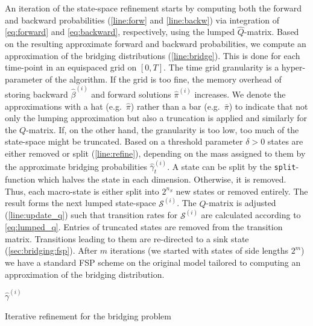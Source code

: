 An iteration of the state-space refinement starts by computing both the
forward and backward probabilities (\autoref{line:forw} and
\autoref{line:backw})  via integration of
\eqref{eq:forward} and
\eqref{eq:backward}, respectively, using
the lumped $\hat Q$-matrix.
Based on the resulting approximate forward and backward probabilities, we
compute an approximation of the
bridging distributions (\autoref{line:bridge}).
This is done for each time-point in an equispaced grid on $[0,T]$.
The time grid granularity is a hyper-parameter of the algorithm.
If the grid is too fine, the memory overhead of storing backward
$\hat\beta^{(i)}$
and forward solutions $\hat\pi^{(i)}$ increases.
{We denote the approximations with a hat (e.g.\ $\hat{\pi}$) rather
  than a bar (e.g.\ $\bar{\pi}$) to indicate that not only the lumping
  approximation but also a truncation is applied and similarly for the
$Q$-matrix.}
If, on the other hand, the granularity is too low, too much of
the state-space might be truncated.
Based on a threshold parameter $\delta>0$
states are either removed or split (\autoref{line:refine}), depending on
the mass assigned to them by the approximate bridging
probabilities $\hat\gamma^{(i)}_t$.
A state can be split by the \texttt{split}-function which
halves the state in each dimension.
Otherwise, it is removed.
Thus, each macro-state is either split into $2^{n_S}$ new states or removed
entirely.
The result forms the next lumped state-space $\mathcal{S}^{(i)}$.
The   $Q$-matrix is adjusted (\autoref{line:update_q}) such that
transition rates  for $\mathcal{S}^{(i)}$  are calculated according to
\eqref{eq:lumped_q}.
Entries of truncated states are removed from the transition matrix.
Transitions leading to them are
re-directed to a sink state (\autoref{sec:bridging:fsp}).
After $m$ iterations (we started with states of side lengths $2^m$)
we have a standard \ac{FSP} scheme
on the original model tailored to
computing an approximation of the bridging distribution.
\begin{algorithm}[htb]
  \Return ${\hat\gamma}^{(i)}$\;
  \caption{Iterative refinement for the bridging problem}
  \label{alg:refinement}
\end{algorithm}

